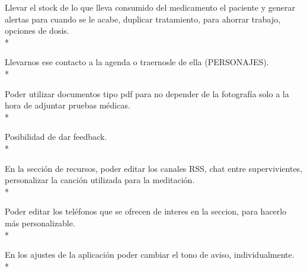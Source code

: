 \documentclass[../pfc.tex]{subfiles}
\begin{document}
	Llevar el stock de lo que lleva consumido del medicamento el paciente y generar alertas para cuando se le acabe, duplicar tratamiento, para ahorrar trabajo, opciones de dosis.\\*
	
	Llevarnos ese contacto a la agenda o traernosle de ella (PERSONAJES).\\*
	
	Poder utilizar documentos tipo pdf para no depender de la fotografía solo a la hora de adjuntar pruebas médicas.\\*
	
	Posibilidad de dar feedback.\\*
	
	En la sección de recursos, poder editar los canales RSS, chat entre supervivientes, personalizar la canción utilizada para la meditación.\\*
	
	Poder editar los teléfonos que se ofrecen de interes en la seccion, para hacerlo más personalizable.\\*
	
	En los ajustes de la aplicación poder cambiar el tono de aviso, individualmente.\\* 
		
	
	


	

	
\end{document}
